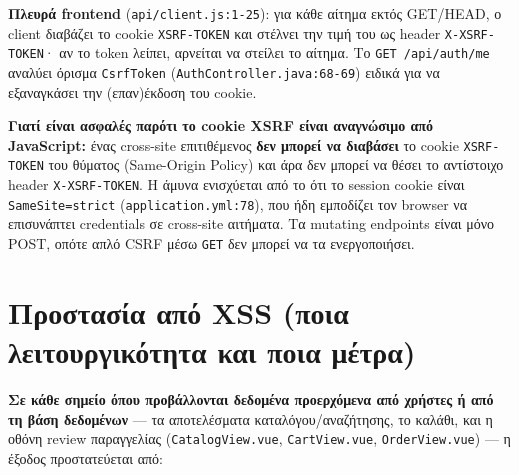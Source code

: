 \documentclass[11pt,a4paper]{article}
\newcommand{\code}[1]{\texttt{#1}}
\begin{document}
\textbf{Πλευρά frontend} (\code{api/client.js:1-25}): για κάθε αίτημα εκτός GET/HEAD, ο client
διαβάζει το cookie \code{XSRF-TOKEN} και στέλνει την τιμή του ως header \code{X-XSRF-TOKEN}· αν το
token λείπει, αρνείται να στείλει το αίτημα. Το \code{GET /api/auth/me} αναλύει όρισμα
\code{CsrfToken} (\code{AuthController.java:68-69}) ειδικά για να εξαναγκάσει την (επαν)έκδοση του
cookie.

\textbf{Γιατί είναι ασφαλές παρότι το cookie XSRF είναι αναγνώσιμο από JavaScript:} ένας cross-site
επιτιθέμενος \textbf{δεν μπορεί να διαβάσει} το cookie \code{XSRF-TOKEN} του θύματος (Same-Origin
Policy) και άρα δεν μπορεί να θέσει το αντίστοιχο header \code{X-XSRF-TOKEN}. Η άμυνα ενισχύεται από
το ότι το session cookie είναι \code{SameSite=strict} (\code{application.yml:78}), που ήδη εμποδίζει
τον browser να επισυνάπτει credentials σε cross-site αιτήματα. Τα mutating endpoints είναι μόνο POST,
οπότε απλό CSRF μέσω \code{GET} δεν μπορεί να τα ενεργοποιήσει.

\section{Προστασία από XSS (ποια λειτουργικότητα και ποια μέτρα)}
\label{sec:xss}

\textbf{Σε κάθε σημείο όπου προβάλλονται δεδομένα προερχόμενα από χρήστες ή από τη βάση δεδομένων} --- τα αποτελέσματα καταλόγου/αναζήτησης, το
καλάθι, και η οθόνη review παραγγελίας (\code{CatalogView.vue}, \code{CartView.vue},
\code{OrderView.vue}) --- η έξοδος προστατεύεται από:
\end{document}
